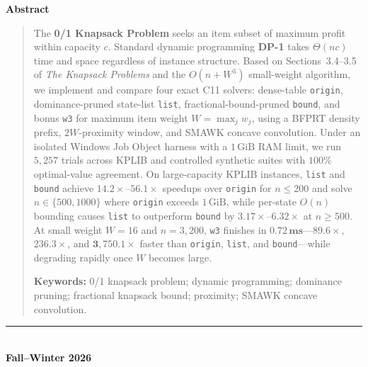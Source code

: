 \documentclass[10pt, a4paper]{article}
\newcommand{\code}[1]{\texttt{\color{primary!90!black}#1}}
\begin{document}
\begin{titlepage}
\vspace{0.55cm}
\begin{center}
    {\large\bfseries\color{primary} Abstract}
\end{center}
\vspace{-0.25em}
\begin{quote}
\small\noindent
The \textbf{0/1 Knapsack Problem} seeks an item subset of maximum profit within capacity $c$. Standard dynamic programming \textbf{DP-1} takes $\Theta(nc)$ time and space regardless of instance structure. Based on Sections~3.4--3.5 of \emph{The Knapsack Problems} and the $O(n + W^3)$ small-weight algorithm, we implement and compare four exact C11 solvers: dense-table \code{origin}, dominance-pruned state-list \code{list}, fractional-bound-pruned \code{bound}, and bonus \code{w3} for maximum item weight $W = \max_j w_j$, using a BFPRT density prefix, $2W$-proximity window, and SMAWK concave convolution. Under an isolated Windows Job Object harness with a $1\,\text{GiB}$ RAM limit, we run $5{,}257$ trials across KPLIB and controlled synthetic suites with $100\%$ optimal-value agreement. On large-capacity KPLIB instances, \code{list} and \code{bound} achieve $\mathbf{14.2\times\text{--}56.1\times}$ speedups over \code{origin} for $n \le 200$ and solve $n \in \{500, 1000\}$ where \code{origin} exceeds $1\,\text{GiB}$, while per-state $O(n)$ bounding causes \code{list} to outperform \code{bound} by $\mathbf{3.17\times\text{--}6.32\times}$ at $n \ge 500$. At small weight $W = 16$ and $n = 3{,}200$, \code{w3} finishes in $\mathbf{0.72\,\text{ms}}$---$\mathbf{89.6\times}$, $\mathbf{236.3\times}$, and $\mathbf{3{,}750.1\times}$ faster than \code{origin}, \code{list}, and \code{bound}---while degrading rapidly once $W$ becomes large.

\vspace{0.5em}\noindent
{\color{primary}\textbf{Keywords:}} 0/1 knapsack problem; dynamic programming; dominance pruning; fractional knapsack bound; proximity; SMAWK concave convolution.
\end{quote}

\vfill
\begin{center}
    {\color{accent!80}\rule{0.14\textwidth}{0.8pt}}\\[0.25cm]
    {\normalsize\bfseries\color{primary} Fall--Winter 2026}
\end{center}
\end{titlepage}

\thispagestyle{plain}
\vspace*{0.3cm}
\tableofcontents
\clearpage
\end{document}

